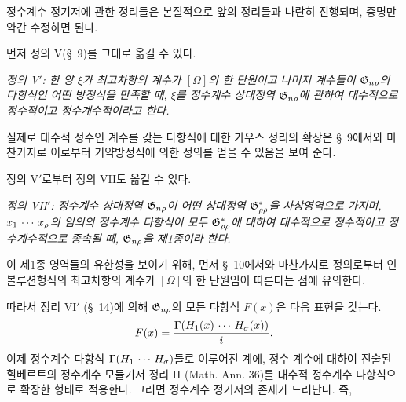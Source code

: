 정수계수 정기저에 관한 정리들은 본질적으로 앞의 정리들과 나란히 진행되며, 증명만 약간 수정하면 된다.

먼저 정의 V(\S\ 9)를 그대로 옮길 수 있다.

\emph{정의 V$'$: 한 양 $\xi$가 최고차항의 계수가 $[\Omega]$의 한 단원이고 나머지 계수들이 $\mathfrak G_{n\rho}$의 다항식인 어떤 방정식을 만족할 때, $\xi$를 정수계수 상대정역 $\mathfrak G_{n\rho}$에 관하여 대수적으로 정수적이고 정수계수적이라고 한다.}

실제로 대수적 정수인 계수를 갖는 다항식에 대한 가우스 정리의 확장은 \S\ 9에서와 마찬가지로 이로부터 기약방정식에 의한 정의를 얻을 수 있음을 보여 준다.

정의 V$'$로부터 정의 VII도 옮길 수 있다.

\emph{정의 VII$'$: 정수계수 상대정역 $\mathfrak G_{n\rho}$이 어떤 상대정역 $\mathfrak G^*_{\rho\rho}$을 사상영역으로 가지며, $x_1\,\cdots\, x_\rho$의 임의의 정수계수 다항식이 모두 $\mathfrak G^*_{\rho\rho}$에 대하여 대수적으로 정수적이고 정수계수적으로 종속될 때, $\mathfrak G_{n\rho}$을 제1종이라 한다.}

이 제1종 영역들의 유한성을 보이기 위해, 먼저 \S\ 10에서와 마찬가지로 정의로부터 인볼루션형식의 최고차항의 계수가 $[\Omega]$의 한 단원임이 따른다는 점에 유의한다.

따라서 정리 VI$'$ (\S\ 14)에 의해 $\mathfrak G_{n\rho}$의 모든 다항식 $F(x)$은 다음 표현을 갖는다.
\[
  F(x)=\frac{\Gamma(H_1(x)\,\cdots\, H_\sigma(x))}{i}.
\]
이제 정수계수 다항식 $\Gamma(H_1\,\cdots\, H_\sigma)$들로 이루어진 계에, 정수 계수에 대하여 진술된 힐베르트의 정수계수 모듈기저 정리 II (Math. Ann. 36)를 대수적 정수계수 다항식으로 확장한 형태로 적용한다. 그러면 정수계수 정기저의 존재가 드러난다. 즉,

